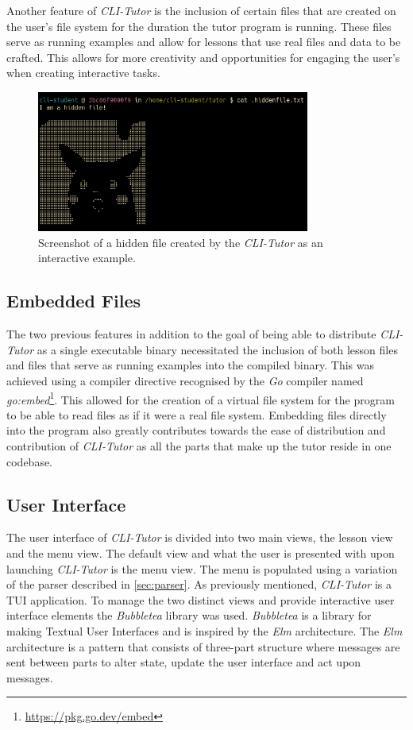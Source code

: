 Another feature of \textit{CLI-Tutor} is the inclusion of certain files that
are created on the user's file system for the duration the tutor program is
running. These files serve as running examples and allow for lessons that use
real files and data to be crafted. This allows for more creativity and
opportunities for engaging the user's when creating interactive tasks.

\begin{figure}[htbp]
	\centering
	\includegraphics[width=0.8\textwidth]{img/hidden}
    \caption{Screenshot of a hidden file created by the \textit{CLI-Tutor} as an interactive example.}
	\label{fig:hidden}
\end{figure}

 
\subsection{Embedded Files}

The two previous features in addition to the goal of being able to distribute
\textit{CLI-Tutor} as a single executable binary necessitated the inclusion of
both lesson files and files that serve as running examples into the compiled
binary. This was achieved using a compiler directive recognised by the \textit{Go}
compiler named \textit{go:embed}\footnote{\url{https://pkg.go.dev/embed}}. This
allowed for the creation of a virtual file system for the program to be able to
read files as if it were a real file system. Embedding files directly into
the program also greatly contributes towards the ease of distribution and
contribution of \textit{CLI-Tutor} as all the parts that make up the tutor reside
in one codebase.

\subsection{User Interface}

The user interface of \textit{CLI-Tutor} is divided into two main views, the
lesson view and the menu view. The default view and what the user is presented with
upon launching \textit{CLI-Tutor} is the menu view. The menu is populated using
a variation of the parser described in \autoref{sec:parser}. As previously
mentioned, \textit{CLI-Tutor} is a TUI application. To manage the two distinct
views and provide interactive user interface elements the \textit{Bubbletea}
library was used. \textit{Bubbletea} is a library for making Textual User
Interfaces and is inspired by the \textit{Elm} architecture. The \textit{Elm}
architecture is a pattern that consists of three-part structure where messages
are sent between parts to alter state, update the user interface and act upon
messages.

